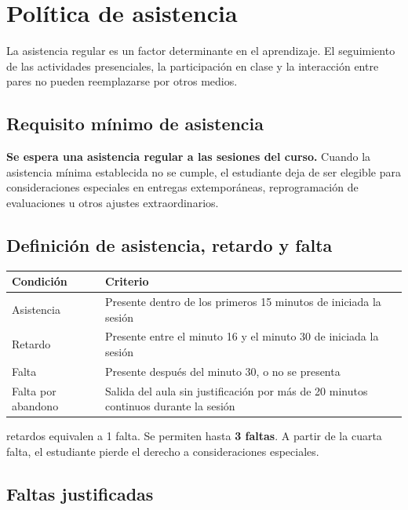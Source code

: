 \documentclass[12pt]{article}
\begin{document}
	\section*{Política de asistencia}
	
	La asistencia regular es un factor determinante en el aprendizaje. El seguimiento de las actividades presenciales, la participación en clase y la interacción entre pares no pueden reemplazarse por otros medios.
	
	\subsection*{Requisito mínimo de asistencia}
	
	\textbf{Se espera una asistencia regular a las sesiones del curso.} Cuando la asistencia mínima establecida no se cumple, el estudiante deja de ser elegible para consideraciones especiales en entregas extemporáneas, reprogramación de evaluaciones u otros ajustes extraordinarios.
	
	\subsection*{Definición de asistencia, retardo y falta}
	
	\begin{center}
		\begin{tabular}{|l|p{8cm}|}
			\hline
			\textbf{Condición} & \textbf{Criterio} \\
			\hline
			Asistencia & Presente dentro de los primeros 15 minutos de iniciada la sesión \\
			\hline
			Retardo & Presente entre el minuto 16 y el minuto 30 de iniciada la sesión \\
			\hline
			Falta & Presente después del minuto 30, o no se presenta \\
			\hline
			Falta por abandono & Salida del aula sin justificación por más de 20 minutos continuos durante la sesión \\
			\hline
		\end{tabular}
	\end{center}
	
	\vspace{0.5em}
	
	 retardos equivalen a 1 falta. Se permiten hasta \textbf{3 faltas}. A partir de la cuarta falta, el estudiante pierde el derecho a consideraciones especiales.
	
	\subsection*{Faltas justificadas}
	
\end{document}
